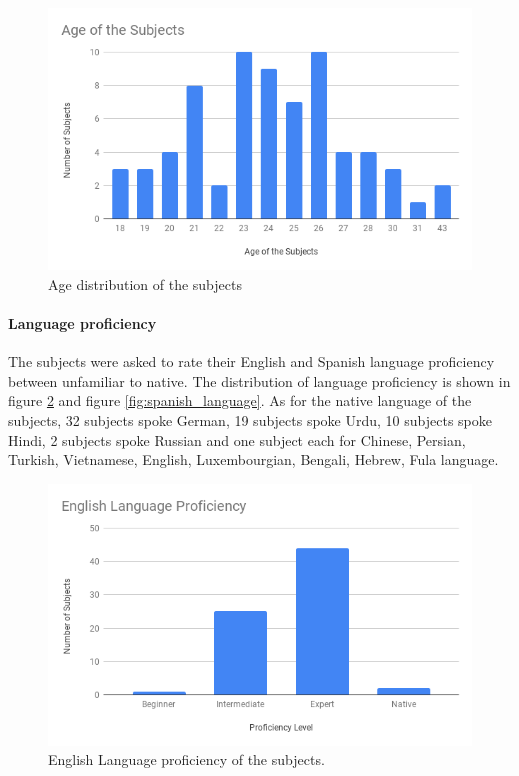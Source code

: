 \begin{figure}
    \centering
    \includegraphics[width=140mm]{Figures/age_of_subjects.png}
    \caption{Age distribution of the subjects}
    \label{fig:age_distribution}
\end{figure}

\paragraph{Language proficiency} The subjects were asked to rate their English and Spanish language proficiency between unfamiliar to native. The distribution of language proficiency is shown in figure \ref{fig:english_language} and figure \ref{fig:spanish_language}. As for the native language of the subjects, 32 subjects spoke German, 19 subjects spoke Urdu, 10 subjects spoke Hindi, 2 subjects spoke Russian and one subject each for Chinese, Persian, Turkish, Vietnamese, English, Luxembourgian, Bengali, Hebrew, Fula language.

\begin{figure}
    \centering
    \includegraphics[width=140mm]{Figures/english_language_proficiency.png}
    \caption{English Language proficiency of the subjects.}
    \label{fig:english_language}
\end{figure}

